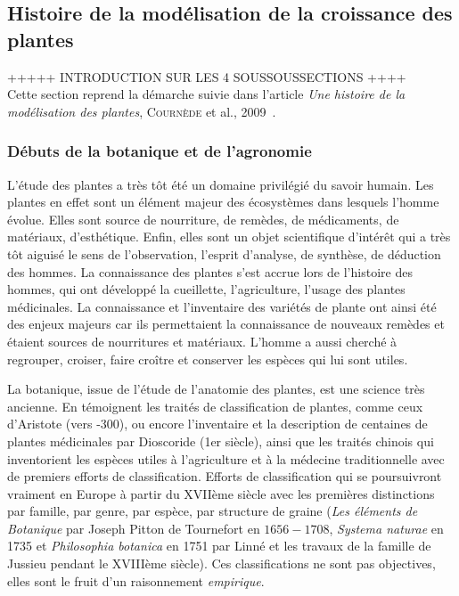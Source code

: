 \subsection{Histoire de la modélisation de la croissance des plantes}
+++++ INTRODUCTION SUR LES 4 SOUSSOUSSECTIONS ++++ \\
Cette section reprend la démarche suivie dans 
l'article \emph{Une histoire de la modélisation des plantes}, \textsc{Cournède} et al., 2009~\cite{histoire_mod_plantes}.

\subsubsection{Débuts de la botanique et de l'agronomie}
L’étude des plantes a très tôt été un domaine privilégié du savoir humain.
Les plantes en effet sont un élément majeur des écosystèmes dans lesquels l’homme évolue. Elles sont source de nourriture, de remèdes, de médicaments,
de matériaux, d’esthétique. 
Enfin, elles sont un objet scientifique d’intérêt qui a très tôt aiguisé le sens de l’observation, l’esprit d’analyse, de synthèse, de déduction des hommes. 
La connaissance des plantes s’est accrue lors de l’histoire des hommes, qui ont développé la cueillette, l’agriculture, l’usage des plantes
médicinales. 
La connaissance et l’inventaire des variétés de plante ont ainsi été des
enjeux majeurs car ils permettaient la connaissance de nouveaux remèdes
et étaient sources de nourritures et matériaux. 
L’homme a aussi cherché à regrouper, croiser, faire croître 
et conserver les espèces qui lui sont utiles.

La botanique, issue de l’étude de l’anatomie des plantes,
est une science très ancienne.
En témoignent les traités de classification de plantes, comme ceux
d’Aristote (vers -300), ou encore l’inventaire et la description de
centaines de plantes médicinales par Dioscoride (1er siècle),
ainsi que les traités chinois qui inventorient les espèces utiles à
l’agriculture et à la médecine traditionnelle avec de premiers efforts
de classification. 
Efforts de classification qui se poursuivront vraiment en Europe à partir du
XVIIème siècle avec les premières distinctions par famille, par genre,
par espèce, par structure de graine (\emph{Les éléments de Botanique} par
Joseph Pitton de Tournefort en $1656-1708$, \emph{Systema naturae} en 1735
et \emph{Philosophia botanica} en 1751 par Linné et les travaux de la
famille de Jussieu pendant le XVIIIème siècle).
Ces classifications ne sont pas objectives, 
elles sont le fruit d’un raisonnement \emph{empirique}.

